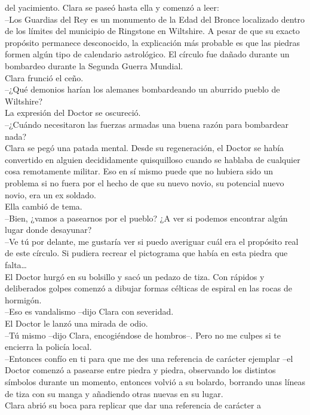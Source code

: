 del yacimiento. Clara se paseó hasta ella y comenzó a leer:\\
--Los Guardias del Rey es un monumento de la Edad del Bronce localizado
dentro de los límites del municipio de Ringstone en Wiltshire. A pesar
de que su exacto propósito permanece desconocido, la explicación más
probable es que las piedras formen algún tipo de calendario astrológico.
El círculo fue dañado durante un bombardeo durante la Segunda Guerra
Mundial.\\
Clara frunció el ceño.\\
--¿Qué demonios harían los alemanes bombardeando un aburrido pueblo de
Wiltshire?\\
La expresión del Doctor se oscureció.\\
--¿Cuándo necesitaron las fuerzas armadas una buena razón para
bombardear nada?\\
Clara se pegó una patada mental. Desde su regeneración, el Doctor se
había convertido en alguien decididamente quisquilloso cuando se hablaba
de cualquier cosa remotamente militar. Eso en sí mismo puede que no
hubiera sido un problema si no fuera por el hecho de que su nuevo novio,
su potencial nuevo novio, era un ex soldado.\\
Ella cambió de tema.\\
--Bien, ¿vamos a pasearnos por el pueblo? ¿A ver si podemos encontrar
algún lugar donde desayunar?\\
--Ve tú por delante, me gustaría ver si puedo averiguar cuál era el
propósito real de este círculo. Si pudiera recrear el pictograma que
había en esta piedra que falta\ldots{}\\
El Doctor hurgó en su bolsillo y sacó un pedazo de tiza. Con rápidos y
deliberados golpes comenzó a dibujar formas célticas de espiral en las
rocas de hormigón.\\
--Eso es vandalismo --dijo Clara con severidad.\\
El Doctor le lanzó una mirada de odio.\\
--Tú mismo --dijo Clara, encogiéndose de hombros--. Pero no me culpes si
te encierra la policía local.\\
--Entonces confío en ti para que me des una referencia de carácter
ejemplar --el Doctor comenzó a pasearse entre piedra y piedra,
observando los distintos símbolos durante un momento, entonces volvió a
su bolardo, borrando unas líneas de tiza con su manga y añadiendo otras
nuevas en su lugar.\\
Clara abrió su boca para replicar que dar una referencia de carácter a
